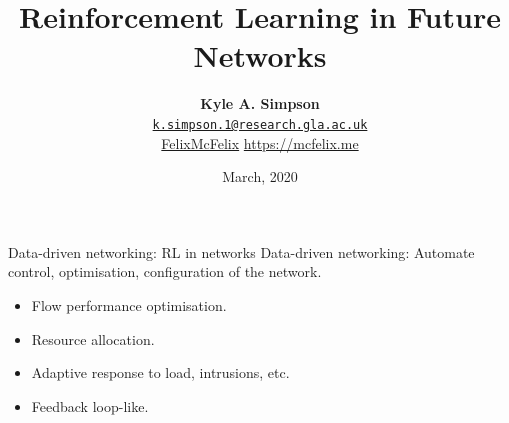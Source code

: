\documentclass[aspectratio=169,xcolor={dvipsnames}
,handout
]{beamer}
\title{Reinforcement Learning in Future Networks}
\author{\vspace{-1em}\textbf{Kyle A. Simpson}\\
	\faEnvelopeO{} \href{mailto:k.simpson.1@research.gla.ac.uk}{\nolinkurl{k.simpson.1@research.gla.ac.uk}}\\
	\vspace{1em}\small{\faGithub{} \href{https://github.com/felixmcfelix}{FelixMcFelix} \hspace{0.5em} \faGlobe{} \url{https://mcfelix.me}}}
\institute{University of Glasgow}
\date{\nth{27} March, 2020}
\begin{document}
\begin{frame}
\maketitle
\end{frame}

\begin{frame}{Data-driven networking: RL in networks}
	\alert{Data-driven networking}: Automate control, optimisation, configuration of the network.
	\begin{itemize}
		\item Flow performance optimisation.
		\item Resource allocation.
		\item Adaptive response to load, intrusions, etc.
		\item Feedback loop-like.
	\end{itemize}
\end{frame}
\end{document}
